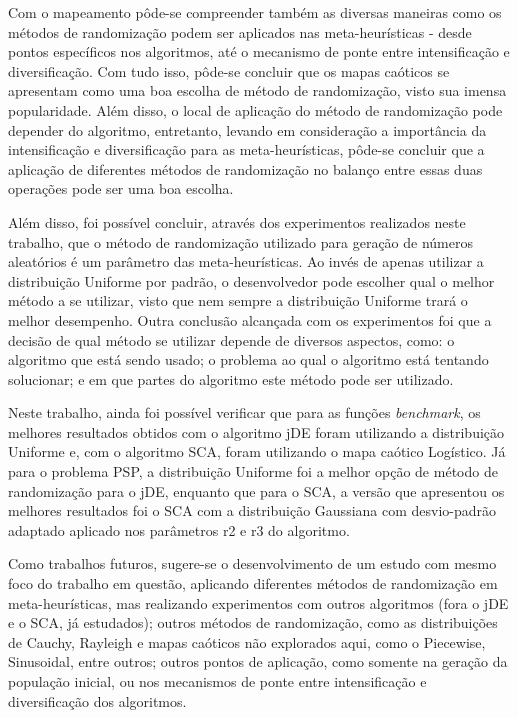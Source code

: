 Com o mapeamento pôde-se compreender também as diversas maneiras como os métodos de randomização podem ser aplicados nas meta-heurísticas - desde pontos específicos nos algoritmos, até o mecanismo de ponte entre intensificação e diversificação. Com tudo isso, pôde-se concluir que os mapas caóticos se apresentam como uma boa escolha de método de randomização, visto sua imensa popularidade. Além disso, o local de aplicação do método de randomização pode depender do algoritmo, entretanto, levando em consideração a importância da intensificação e diversificação para as meta-heurísticas, pôde-se concluir que a aplicação de diferentes métodos de randomização no balanço entre essas duas operações pode ser uma boa escolha.

Além disso, foi possível concluir, através dos experimentos realizados neste trabalho, que o método de randomização utilizado para geração de números aleatórios é um parâmetro das meta-heurísticas. Ao invés de apenas utilizar a distribuição Uniforme por padrão, o desenvolvedor pode escolher qual o melhor método a se utilizar, visto que nem sempre a distribuição Uniforme trará o melhor desempenho. Outra conclusão alcançada com os experimentos foi que a decisão de qual método se utilizar depende de diversos aspectos, como: o algoritmo que está sendo usado; o problema ao qual o algoritmo está tentando solucionar; e em que partes do algoritmo este método pode ser utilizado.

Neste trabalho, ainda foi possível verificar que para as funções \textit{benchmark}, os melhores resultados obtidos com o algoritmo jDE foram utilizando a distribuição Uniforme e, com o algoritmo SCA, foram utilizando o mapa caótico Logístico. Já para o problema PSP, a distribuição Uniforme foi a melhor opção de método de randomização para o jDE, enquanto que para o SCA, a versão que apresentou os melhores resultados foi o SCA com a distribuição Gaussiana com desvio-padrão adaptado aplicado nos parâmetros r2 e r3 do algoritmo.

Como trabalhos futuros, sugere-se o desenvolvimento de um estudo com mesmo foco do trabalho em questão, aplicando diferentes métodos de randomização em meta-heurísticas, mas realizando experimentos com outros algoritmos (fora o jDE e o SCA, já estudados); outros métodos de randomização, como as distribuições de Cauchy, Rayleigh e mapas caóticos não explorados aqui, como o Piecewise, Sinusoidal, entre outros; outros pontos de aplicação, como somente na geração da população inicial, ou nos mecanismos de ponte entre intensificação e diversificação dos algoritmos.

